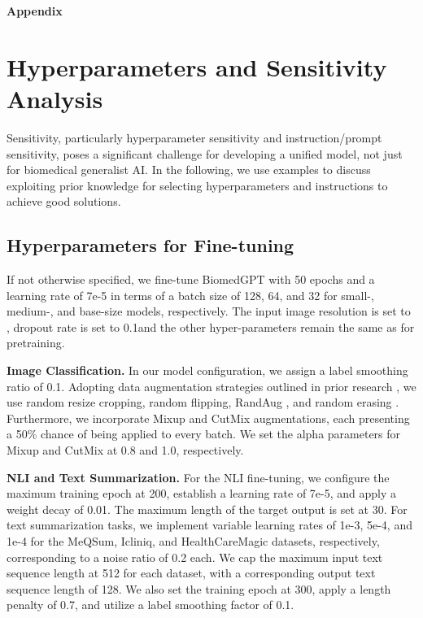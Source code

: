 \documentclass[10pt]{article} \usepackage[preprint]{tmlr}
\begin{document}
\newpage



\clearpage
\appendix 
\label{sec:appendix}

{\LARGE \bf \noindent Appendix}

\section{Hyperparameters and Sensitivity Analysis} \label{appx:hyperparam}

Sensitivity, particularly hyperparameter sensitivity and instruction/prompt sensitivity, poses a significant challenge for developing a unified model, not just for biomedical generalist AI. In the following, we use examples to discuss exploiting prior knowledge for selecting hyperparameters and instructions to achieve good solutions. 

\subsection{Hyperparameters for Fine-tuning} 
If not otherwise specified, we fine-tune BiomedGPT with 50 epochs and a learning rate of 7e-5 in terms of a batch size of 128, 64, and 32 for small-, medium-, and base-size models, respectively. The input image resolution is set to , dropout \citep{srivastava2014dropout} rate is set to 0.1and the other hyper-parameters remain the same as for pretraining. 

\vspace{5pt}
\noindent \textbf{Image Classification.} In our model configuration, we assign a label smoothing \citep{szegedy2016rethinking} ratio of 0.1. Adopting data augmentation strategies outlined in prior research \cite{wang2022ofa, bao2021beit}, we use random resize cropping, random flipping, RandAug \citep{cubuk2020randaugment}, and random erasing \citep{zhong2020random}. Furthermore, we incorporate Mixup \cite{zhang2018mixup} and CutMix \citep{yun2019cutmix} augmentations, each presenting a 50\% chance of being applied to every batch. We set the alpha parameters for Mixup and CutMix at 0.8 and 1.0, respectively.

\vspace{5pt}
\noindent \textbf{NLI and Text Summarization.} For the NLI fine-tuning, we configure the maximum training epoch at 200, establish a learning rate of 7e-5, and apply a weight decay of 0.01. The maximum length of the target output is set at 30. For text summarization tasks, we implement variable learning rates of 1e-3, 5e-4, and 1e-4 for the MeQSum, Icliniq, and HealthCareMagic datasets, respectively, corresponding to a noise ratio of 0.2 each. We cap the maximum input text sequence length at 512 for each dataset, with a corresponding output text sequence length of 128. We also set the training epoch at 300, apply a length penalty of 0.7, and utilize a label smoothing factor of 0.1.
\end{document}

